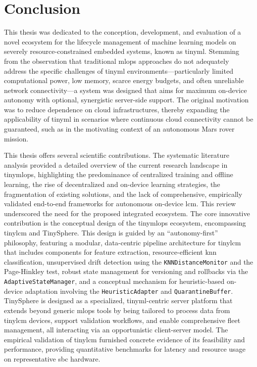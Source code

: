 
\chapter{Conclusion}
\label{chp:Conclusion}

This thesis was dedicated to the conception, development, and evaluation of a novel ecosystem for the lifecycle management of machine learning models on severely resource-constrained embedded systems, known as \gls{tinyml}. Stemming from the observation that traditional \gls{mlops} approaches do not adequately address the specific challenges of \gls{tinyml} environments—particularly limited computational power, low memory, scarce energy budgets, and often unreliable network connectivity—a system was designed that aims for maximum on-device autonomy with optional, synergistic server-side support. The original motivation was to reduce dependence on cloud infrastructures, thereby expanding the applicability of \gls{tinyml} in scenarios where continuous cloud connectivity cannot be guaranteed, such as in the motivating context of an autonomous Mars rover mission.

This thesis offers several scientific contributions. The systematic literature analysis provided a detailed overview of the current research landscape in \gls{tinymlops}, highlighting the predominance of centralized training and offline learning, the rise of decentralized and on-device learning strategies, the fragmentation of existing solutions, and the lack of comprehensive, empirically validated end-to-end frameworks for autonomous on-device \gls{lcm}. This review underscored the need for the proposed integrated ecosystem. The core innovative contribution is the conceptual design of the \gls{tinymlops} ecosystem, encompassing \gls{tinylcm} and TinySphere. This design is guided by an ``autonomy-first'' philosophy, featuring a modular, data-centric pipeline architecture for \gls{tinylcm} that includes components for feature extraction, resource-efficient \gls{knn} classification, unsupervised drift detection using the \texttt{KNNDistanceMonitor} and the Page-Hinkley test, robust state management for versioning and rollbacks via the \texttt{AdaptiveStateManager}, and a conceptual mechanism for heuristic-based on-device adaptation involving the \texttt{HeuristicAdapter} and \texttt{QuarantineBuffer}. TinySphere is designed as a specialized, \gls{tinyml}-centric server platform that extends beyond generic \gls{mlops} tools by being tailored to process data from \gls{tinylcm} devices, support validation workflows, and enable comprehensive fleet management, all interacting via an opportunistic client-server model. The empirical validation of \gls{tinylcm} furnished concrete evidence of its feasibility and performance, providing quantitative benchmarks for latency and resource usage on representative \gls{sbc} hardware.

